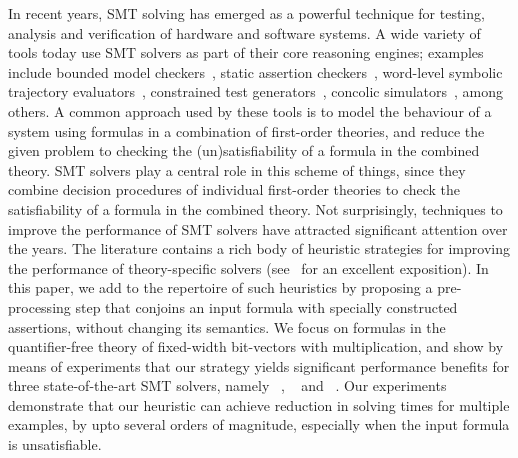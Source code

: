 %
In recent years, SMT solving has emerged as a powerful technique for
testing, analysis and verification of hardware and software systems.
A wide variety of tools today use SMT solvers as part of their core
reasoning engines; examples include bounded model
checkers~\cite{hwcbmc,boolector,ebmc,cbmc}, static assertion
checkers~\cite{corral,boogie}, word-level symbolic trajectory
evaluators~\cite{wste}, constrained test
generators~\cite{crv1,crv2,dart}, concolic simulators~\cite{concolic},
among others.  A common approach used by these tools is to model the
behaviour of a system using formulas in a combination of first-order
theories, and reduce the given problem to checking the
(un)satisfiability of a formula in the combined theory.  SMT solvers
play a central role in this scheme of things, since they combine
decision procedures of individual first-order theories to check the
satisfiability of a formula in the combined theory.  Not surprisingly,
techniques to improve the performance of SMT solvers have attracted
significant attention over the years.  The literature contains a rich
body of heuristic strategies for improving the performance of
theory-specific solvers (see~\cite{deMoura2013} for an excellent
exposition).  In this paper, we add to the repertoire of such
heuristics by proposing a pre-processing step that conjoins an input
formula with specially constructed assertions, without changing its
semantics. We focus on formulas in the quantifier-free theory of
fixed-width bit-vectors with multiplication, and show by means of
experiments that our strategy yields significant performance benefits
for three state-of-the-art SMT solvers, namely
{\zthree}~\cite{zthree}, {\cvcfour}~\cite{cvcfour} and
{\boolector}~\cite{boolector}.  Our experiments demonstrate that our
heuristic can achieve reduction in solving times for multiple examples,
by upto several orders of magnitude, especially when the input formula
is unsatisfiable.


